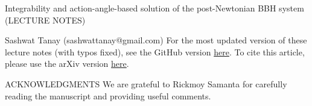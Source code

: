\documentclass[12pt]{report}
\begin{document}
\begin{titlepage}


\begin{center}
{\Large Integrability and action-angle-based solution of the post-Newtonian BBH system}\\
(LECTURE NOTES)\\
\end{center}
\begin{center}
Sashwat Tanay (sashwattanay@gmail.com)
\linebreak
\linebreak
\linebreak
\linebreak
\linebreak
For the most updated version of these lecture notes (with typos fixed), 
see the GitHub version \href{https://github.com/sashwattanay/lectures_integrability_action-angles_PN_BBH/blob/gh-action-result/pdflatex/lecture_notes/main.pdf}{here}.
To cite this article, please use the arXiv version 
\href{https://arxiv.org/abs/2206.05799}{here}.
\end{center}
\newpage
\begin{center}
{\Large ACKNOWLEDGMENTS}
\linebreak
\linebreak
We are grateful to Rickmoy Samanta for carefully reading the manuscript
and providing useful comments.
\end{center}
\end{titlepage}



\tableofcontents















\end{document}
